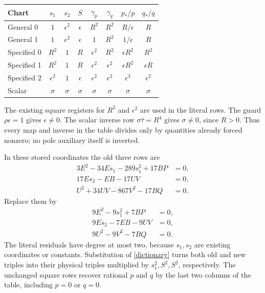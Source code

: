 \documentclass[11pt]{article}
\begin{document}
\begin{center}\small
\begin{tabular}{@{}lccccccc@{}}
\toprule
Chart & $s_1$ & $s_2$ & $S$ & $\gamma_p$ & $\gamma_q$
 & $p_*/p$ & $q_*/q$\\
\midrule
General 0 & $1$ & $\epsilon^2$ & $\epsilon$ & $R^2$ & $R^2$
 & $R/\epsilon$ & $R$\\
General 1 & $1$ & $\epsilon^2$ & $\epsilon$ & $1$ & $R^2$
 & $1/\epsilon$ & $R$\\
Specified 0 & $R^2$ & $1$ & $R$ & $\epsilon^2$ & $R^2$
 & $\epsilon R^2$ & $R^2$\\
Specified 1 & $R^2$ & $1$ & $R$ & $\epsilon^2$ & $\epsilon^2$
 & $\epsilon R^2$ & $\epsilon R$\\
Specified 2 & $\epsilon^2$ & $1$ & $\epsilon$ & $\epsilon^2$ & $\epsilon^2$
 & $\epsilon^3$ & $\epsilon^2$\\
Scalar & $\sigma$ & $\sigma$ & $\sigma$ & $\sigma$ & $\sigma$
 & $\sigma$ & $\sigma$\\
\bottomrule
\end{tabular}
\end{center}
The existing square registers for $R^2$ and $\epsilon^2$ are used
in the literal rows. The guard $\rho\epsilon=1$ gives
$\epsilon\ne0$. The scalar inverse row
$\sigma\widehat\tau=R^4$ gives $\sigma\ne0$, since $R>0$.
Thus every map and inverse in the table divides only by quantities
already forced nonzero; no pole auxiliary itself is inverted.

In these stored coordinates the old three rows are
\begin{align*}
 3E^2-34Es_1-289s_1^2+17BP&=0,\\
 17Es_2-EB-17UV&=0,\\
 U^2+34UV-867V^2-17BQ&=0.
\end{align*}
Replace them by
\begin{equation}\label{storednew}
\begin{aligned}
 9E^2-9s_1^2+7BP&=0,\\
 9Es_2-7EB-9UV&=0,\\
 9U^2-9V^2-7BQ&=0.
\end{aligned}
\end{equation}
The literal residuals have degree at most two, because $s_1,s_2$
are existing coordinates or constants. Substitution of
\eqref{dictionary} turns both old and new triples into their
physical triples multiplied by $s_1^2,S^2,S^2$, respectively.
The unchanged square rows recover rational $p$ and $q$ by the
last two columns of the table, including $p=0$ or $q=0$.
\end{document}
